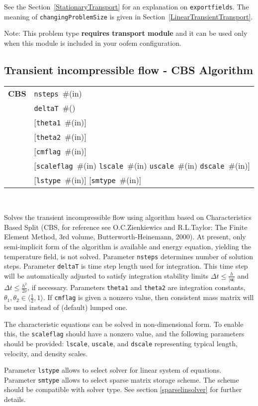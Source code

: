 \documentclass[a4paper]{article}
\makeatletter
\newcommand{\mbf}[1]{\boldsymbol{#1}}
\newcommand{\param}[1]{\texttt{#1}} %
\newcommand{\optional}[1]{[#1]} %
\newcommand{\field}[2]{\param{#1}~\#{\tiny(#2)}} %
\newcommand{\optField}[2]{\optional{\field{#1}{#2}}}
\newcommand{\entKeywordInst}[1]{\textbf{#1}} %
\newenvironment{record}[1][]{\begin{tabular}{|ll}}{\end{tabular}\\}
\newcommand{\recentry}[2]{{#1}&{#2}\\}
\newcounter{rcc}
\newenvironment{record}[1][\textwidth]{\setcounter{rcc}{0}\begin{tabular*}{#1}{|ll@{\extracolsep{\fill}}r}}{\end{tabular*}\\}
\newcommand{\recentry}[2]{\ifthenelse{\value{rcc}>0}{&$\backslash$ \\}{\setcounter{rcc}{1}}{#1}&{#2}}
\makeatother
\begin{document}
See the Section~\ref{StationaryTransport} for an explanation on
\param{exportfields}. The meaning 
of \param{changingProblemSize} is given in Section~\ref{LinearTransientTransport}.

Note: This problem type \textbf{requires transport module} and it
can be used only when this module is included in your oofem
configuration.

\subsection{Transient incompressible flow - CBS Algorithm}
\label{cbsIncomp}
\begin{record}
  \recentry{\entKeywordInst{CBS}}{\field{nsteps}{in}}
  \recentry{}{\field{deltaT}{}}
  \recentry{}{\optField{theta1}{in}}
  \recentry{}{\optField{theta2}{in}}
  \recentry{}{\optField{cmflag}{in}}
  \recentry{}{[\field{scaleflag}{in} \field{lscale}{in} \field{uscale}{in} \field{dscale}{in}]}
  \recentry{}{\optField{lstype}{in} \optField{smtype}{in}}
\end{record}

Solves the transient incompressible flow using algorithm based on
Characteristics Based Split (CBS, for reference see O.C.Zienkiewics
and R.L.Taylor: The Finite Element Method, 3rd volume,
Butterworth-Heinemann, 2000). At present, only semi-implicit form
of the algorithm is available and energy equation, yielding the
temperature field, is not solved.
Parameter \param{nsteps} determines number of solution
steps. Parameter \param{deltaT} is time step length used for
integration. This time step will be automatically adjusted to satisfy
integration stability limits $\Delta t \le {\frac{h}{\vert\mbf{u}\vert}}$ and $\Delta t \le {\frac{h^2}{2\nu}}$, if necessary.
Parameters \param{theta1} and \param{theta2} are integration constants, $\theta_1, \theta_2 \in \langle{\frac12}, 1\rangle$.
If \param{cmflag} is given a nonzero value, then
consistent mass matrix will be used instead of (default) lumped one.

The characteristic equations can be solved in non-dimensional form. To
enable this, the \param{scaleflag} should have a nonzero value,
and the following parameters should be provided: \param{lscale},
\param{uscale}, and \param{dscale} representing typical length,
velocity, and density scales.

Parameter \param{lstype} allows to select solver for linear system of
equations. Parameter \param{smtype} allows to select sparse matrix storage
scheme. The scheme should be compatible with solver type. See section
\ref{sparselinsolver} for further details.
\end{document}
